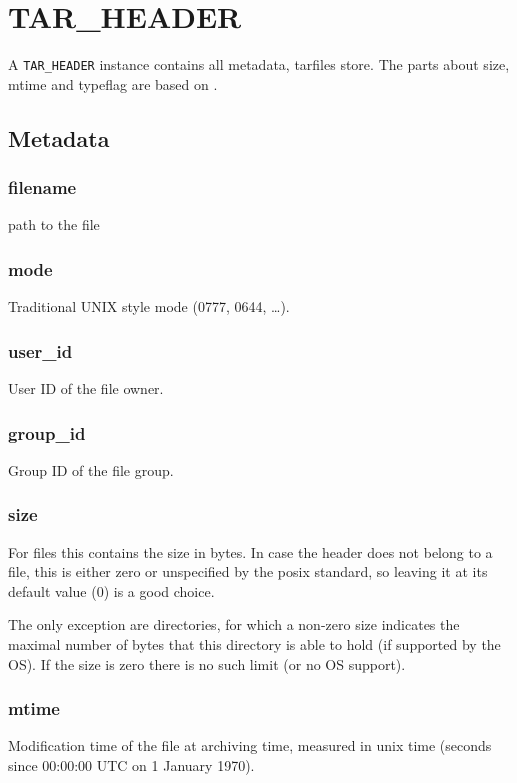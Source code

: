 \chapter{TAR\_HEADER}
A \lstinline|TAR_HEADER| instance contains all metadata, tarfiles store. The
parts about size, mtime and typeflag are based on \cite[Shell \& Utilities - pax]{POSIX:2008}.

\section{Metadata}
\subsection{filename}
path to the file

\subsection{mode}
Traditional UNIX style mode (0777, 0644, \dots).

\subsection{user\_id}
User ID of the file owner.

\subsection{group\_id}
Group ID of the file group.

\subsection{size}
For files this contains the size in bytes. In case the header does not belong
to a file, this is either zero or unspecified by the posix standard, so leaving
it at its default value (0) is a good choice.

The only exception are directories, for which a non-zero size indicates the
maximal number of bytes that this directory is able to hold (if supported by
the OS). If the size is zero there is no such limit (or no OS support).

\subsection{mtime}
Modification time of the file at archiving time, measured in unix time (seconds
since 00:00:00 UTC on 1 January 1970).

